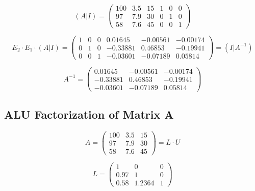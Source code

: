 \begin{equation}
	\left( A | I \right) = \left( \begin{array}{ccc|ccc}
		100 & 3.5 & 15 & 1 & 0 & 0 \\
		97  & 7.9 & 30 & 0 & 1 & 0 \\
		58  & 7.6 & 45 & 0 & 0 & 1
	\end{array} \right)
\end{equation}

\begin{equation}
	E_2 \cdot E_1 \cdot \left( A | I \right) = \left( \begin{array}{ccc|ccc}
			1 & 0 & 0 & 0.01645  & -0.00561 & -0.00174 \\
			0 & 1 & 0 & -0.33881 & 0.46853  & -0.19941 \\
			0 & 0 & 1 & -0.03601 & -0.07189 & 0.05814
		\end{array} \right) = \left( I | A^{-1} \right)
\end{equation}

\begin{equation}
	A^{-1} = \begin{pmatrix}
		0.01645  & -0.00561 & -0.00174 \\
		-0.33881 & 0.46853  & -0.19941 \\
		-0.03601 & -0.07189 & 0.05814
	\end{pmatrix}
\end{equation}

\newpage
\thispagestyle{plain}

\subsection{ALU Factorization of Matrix A}
\begin{equation}
	A = \begin{pmatrix}
		100 & 3.5 & 15 \\
		97  & 7.9 & 30 \\
		58  & 7.6 & 45
	\end{pmatrix} = L \cdot U
\end{equation}

\begin{equation}
	L = \begin{pmatrix}
		1    & 0      & 0 \\
		0.97 & 1      & 0 \\
		0.58 & 1.2364 & 1
	\end{pmatrix}
\end{equation}

